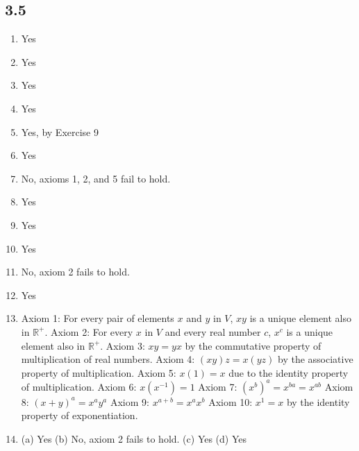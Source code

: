 \documentclass[a4paper,12pt]{article}
\begin{document}
\subsection*{3.5}

\begin{enumerate}

\item Yes

\setcounter{enumi}{2}
\item Yes

\setcounter{enumi}{6}
\item Yes

\setcounter{enumi}{8}
\item Yes

\setcounter{enumi}{9}
\item Yes, by Exercise 9

\setcounter{enumi}{10}
\item Yes

\setcounter{enumi}{12}
\item No, axioms 1, 2, and 5 fail to hold.

\item Yes

\setcounter{enumi}{15}
\item Yes

\item Yes

\item No, axiom 2 fails to hold.

\item Yes

\setcounter{enumi}{20}

\item Axiom 1: For every pair of elements $x$ and $y$ in $V$, $xy$ is a unique element also in $\mathbb{R^+}$. \newline
Axiom 2: For every $x$ in $V$ and every real number $c$, $x^c$ is a unique element also in $\mathbb{R^+}$. \newline
Axiom 3: $xy = yx$ by the commutative property of multiplication of real numbers. \newline
Axiom 4: $(xy)z = x(yz)$ by the associative property of multiplication. \newline
Axiom 5: $x(1) = x$ due to the identity property of multiplication. \newline
Axiom 6: $x(x^{-1}) = 1$ \newline
Axiom 7: ${(x^b)}^a = x ^ {ba} = x ^ {ab}$ \newline
Axiom 8: $(x + y)^a = x^a y^a$ \newline
Axiom 9: $x^{a + b} = x^a x^b$ \newline
Axiom 10: $x^1 = x$ by the identity property of exponentiation.

\setcounter{enumi}{24}

\item (a) Yes \newline
(b) No, axiom 2 fails to hold. \newline
(c) Yes \newline
(d) Yes

\end{enumerate}
\end{document}
